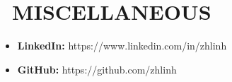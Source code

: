 \documentclass{resume}
\begin{document}
\section{\faInfo\ MISCELLANEOUS}
\begin{itemize}[parsep=0.5ex]
  \item \textbf{LinkedIn:} https://www.linkedin.com/in/zhlinh
  \item \textbf{GitHub:} https://github.com/zhlinh
\end{itemize}

%
%
\end{document}
